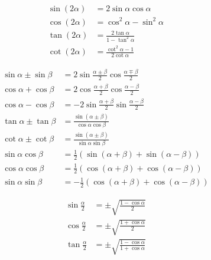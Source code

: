 \documentclass[11pt,twoside]{article}
\begin{document}
\begin{multicols}{3}
\begin{footnotesize}
\begin{equation}
\begin{split}
\sin(2\alpha)&=2\sin\alpha\cos\alpha \\
\cos(2\alpha)&=\cos^2\alpha -\sin^2\alpha \\
\tan(2\alpha)&=\frac{2\tan\alpha}{1-\tan^2\alpha}\\
\cot(2\alpha)&=\frac{\cot^2\alpha - 1}{2\cot\alpha}
\end{split}
\end{equation}

\begin{equation}
\begin{split}
\sin\alpha\pm\sin\beta&=2\sin\frac{\alpha\pm\beta}{2}\cos\frac{\alpha\mp\beta}{2} \\
\cos\alpha+\cos\beta&=2\cos\frac{\alpha+\beta}{2}\cos\frac{\alpha-\beta}{2} \\
\cos\alpha-\cos\beta&=-2\sin\frac{\alpha+\beta}{2}\sin\frac{\alpha-\beta}{2} \\
\tan\alpha \pm \tan\beta &= \frac{\sin(\alpha\pm\beta)}{\cos\alpha\cos\beta} \\
\cot\alpha \pm \cot\beta &= \frac{\sin(\alpha\pm\beta)}{\sin\alpha\sin\beta} \\
\sin\alpha\cos\beta&=\frac{1}{2}(\sin(\alpha+\beta)+\sin(\alpha-\beta)) \\
\cos\alpha\cos\beta&=\frac{1}{2}(\cos(\alpha+\beta)+\cos(\alpha-\beta)) \\
\sin\alpha\sin\beta &= -\frac{1}{2}(\cos(\alpha+\beta)+\cos(\alpha-\beta))
\end{split}
\end{equation}

\begin{equation}
\begin{split}
\sin\frac{\alpha}{2}&=\pm\sqrt{\frac{1-\cos\alpha}{2}} \\
\cos\frac{\alpha}{2}&=\pm\sqrt{\frac{1+\cos\alpha}{2}} \\
\tan\frac{\alpha}{2}&=\pm\sqrt{\frac{1-\cos\alpha}{1+\cos\alpha}}
\end{split}
\end{equation}

\end{footnotesize}
\end{multicols}
\end{document}
